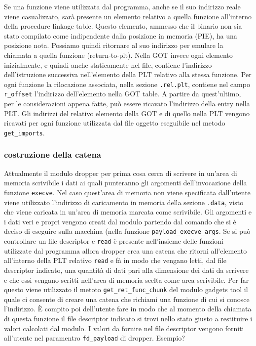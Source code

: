 Se una funzione viene utilizzata dal programma, anche se il suo
indirizzo reale viene casualizzato, sarà presente un elemento relativo
a quella funzione all'interno della procedure linkage table. Questo
elemento, ammesso che il binario non sia stato compilato come
indipendente dalla posizione in memoria (PIE), ha una posizione
nota. Possiamo quindi ritornare al suo indirizzo per emulare la
chiamata a quella funzione (return-to-plt). Nella GOT invece ogni
elemento inizialmente, e quindi anche staticamente nel file, contiene
l'indirizzo dell'istruzione successiva nell'elemento della PLT
relativo alla stessa funzione. Per ogni funzione la rilocazione
associata, nella sezione \lstinline{.rel.plt}, contiene nel campo
\lstinline{r_offset} l'indirizzo dell'elemento nella GOT table. A
partire da quest'ultimo, per le considerazioni appena fatte, può
essere ricavato l'indirizzo della entry nella PLT. Gli indirizzi del
relativo elemento della GOT e di quello nella PLT vengono ricavati per
ogni funzione utilizzata dal file oggetto eseguibile nel metodo
\lstinline{get_imports}.

\subsubsection{costruzione della catena}

Attualmente il modulo dropper per prima cosa cerca di scrivere in
un'area di memoria scrivibile i dati ai quali punteranno gli argomenti
dell'invocazione della funzione \lstinline{execve}. Nel caso
quest'area di memoria non viene specificata dall'utente viene
utilizzato l'indirizzo di caricamento in memoria della sezione
\lstinline{.data}, visto che viene caricata in un'area di memoria
marcata come scrivibile. Gli argomenti e i dati veri e propri vengono
creati dal modulo partendo dal comando che si è deciso di eseguire
sulla macchina (nella funzione \lstinline{payload_execve_args}. Se si
può controllare un file descriptor e \lstinline{read} è presente
nell'insieme delle funzioni utilizzate dal programma allora dropper
crea una catena che ritorni all'elemento all'interno della PLT
relativo \lstinline{read} e fà in modo che vengano letti, dal file
descriptor indicato, una quantità di dati pari alla dimensione dei
dati da scrivere e che essi vengano scritti nell'area di memoria
scelta come area scrivibile. Per far questo viene utilizzato il metoto
\lstinline{get_ret_func_chunk} del modulo gadgets tool il quale ci
consente di creare una catena che richiami una funzione di cui si
conosce l'indirizzo. È compito poi dell'utente fare in modo che al
momento della chiamata di questa funzione il file descriptor indicato
si trovi nello stato giusto a restituire i valori calcolati dal
modulo. I valori da fornire nel file descriptor vengono forniti
all'utente nel paramentro \lstinline{fd_payload} di dropper. 
Esempio?

